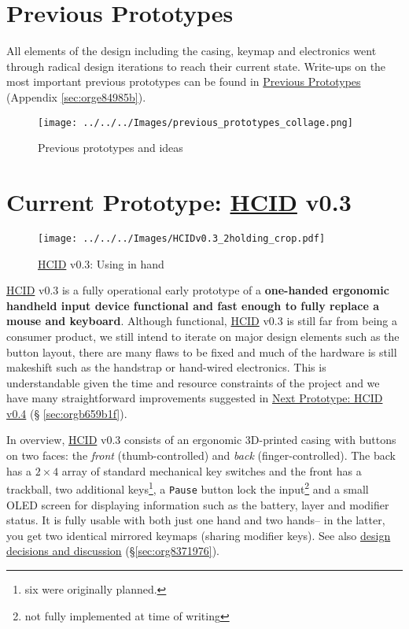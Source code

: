 \documentclass[logo,bsc,singlespacing,parskip]{infthesis}
\begin{document}
\chapter{Previous Prototypes}
\label{sec:org59e2b1a}
All elements of the design including the casing, keymap and electronics went through radical design iterations to reach their current state.
Write-ups on the most important previous prototypes can be found in \hyperref[sec:orge84985b]{Previous Prototypes} (Appendix \ref{sec:orge84985b}).

\begin{figure}[h]
\centering
\texttt{[image: ../../../Images/previous\_prototypes\_collage.png]}
\caption{Previous prototypes and ideas}
\end{figure}
\chapter{Current Prototype: \hyperref[org917851e]{HCID} v0.3}
\label{sec:org0aa7648}
\begin{figure}[h]
\centering
\texttt{[image: ../../../Images/HCIDv0.3\_2holding\_crop.pdf]}
\caption{\hyperref[org917851e]{HCID} v0.3: Using in hand}
\end{figure}

\hyperref[org917851e]{HCID} v0.3 is a fully operational early prototype of a \textbf{one-handed ergonomic handheld input device functional and fast enough to fully replace a mouse and keyboard}.
Although functional, \hyperref[org917851e]{HCID} v0.3 is still far from being a consumer product, we still intend to iterate on major design elements such as the button layout, there are many flaws to be fixed and much of the hardware is still makeshift such as the handstrap or hand-wired electronics.
This is understandable given the time and resource constraints of the project and we have many straightforward improvements suggested in \hyperref[sec:orgb659b1f]{Next Prototype: HCID v0.4}  (§ \ref{sec:orgb659b1f}).

In overview, \hyperref[org917851e]{HCID} v0.3 consists of an ergonomic 3D-printed casing with buttons on two faces: the \emph{front} (thumb-controlled) and \emph{back} (finger-controlled).
The back has a \(2\times4\) array of standard mechanical key switches and the front has a trackball, two additional keys\footnote{six were originally planned.}, a \texttt{Pause} button lock the input\footnote{not fully implemented at time of writing} and a small OLED screen for displaying information such as the battery, layer and modifier status.
It is fully usable with both just one hand and two hands-- in the latter, you get two identical mirrored keymaps (sharing modifier keys).
See also \hyperref[sec:org8371976]{design decisions and discussion} (\S \ref{sec:org8371976}).
\end{document}
